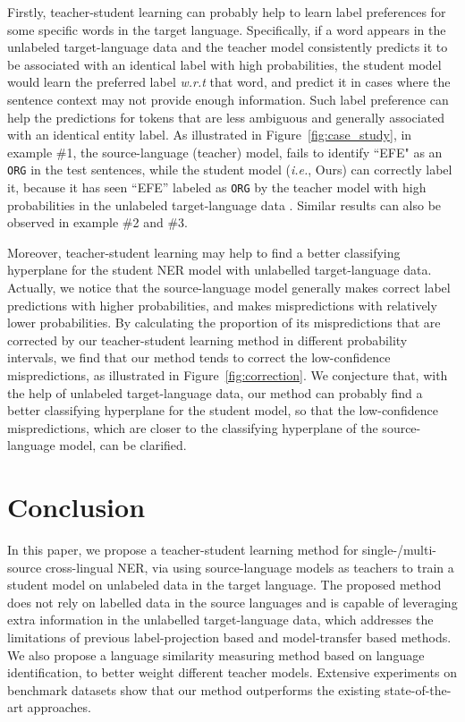 \documentclass[11pt,a4paper]{article}
\newcommand\ie{\textit{i.e.}}
\newcommand\wrt{\textit{w.r.t}}
\begin{document}
	Firstly, teacher-student learning can probably help to learn label preferences for some specific words in the target language. Specifically, if a word appears in the unlabeled target-language data and the teacher model consistently predicts it to be associated with an identical label with high probabilities, the student model would learn the preferred label \wrt{} that word, and predict it in cases where the sentence context may not provide enough information. Such label preference can help the predictions for tokens that are less ambiguous and generally associated with an identical entity label. As illustrated in Figure~\ref{fig:case_study}, in example \#1, the source-language (teacher) model, fails to identify ``EFE" as an \texttt{ORG} in the test sentences, while the student model (\ie, Ours) can correctly label it, because it has seen ``EFE'' labeled as \texttt{ORG} by the teacher model with high probabilities in the unlabeled target-language data . Similar results can also be observed in example \#2 and \#3.


	Moreover, teacher-student learning may help to find a better classifying hyperplane for the student NER model with unlabelled target-language data. Actually, we notice that the source-language model generally makes correct label predictions with higher probabilities, and makes mispredictions with relatively lower probabilities. By calculating the proportion of its mispredictions that are corrected by our teacher-student learning method in different probability intervals, we find that our method tends to correct the low-confidence mispredictions, as illustrated in Figure~\ref{fig:correction}. We conjecture that, with the help of unlabeled target-language data, our method can probably find a  better classifying hyperplane for the student model, so that the low-confidence mispredictions, which are closer to the classifying hyperplane of the source-language model, can be clarified. 

\section{Conclusion}
	In this paper, we propose a teacher-student learning method for single-/multi-source cross-lingual NER, via using source-language models as teachers to train a student model on unlabeled data in the target language. The proposed method does not rely on labelled data in the source languages and is capable of leveraging extra information in the unlabelled target-language data, which addresses the limitations of previous label-projection based and model-transfer based methods. We also propose a language similarity measuring method based on language identification, to better weight different teacher models. Extensive experiments on benchmark datasets show that our method outperforms the existing state-of-the-art approaches. 



	
	
\end{document}
